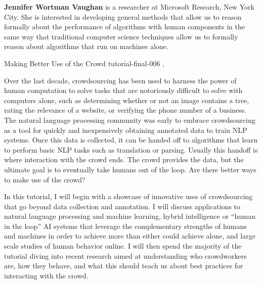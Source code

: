 \begin{bio}
  {\bfseries Jennifer Wortman Vaughan} is a researcher at Microsoft Research,
  New York City. She is interested in developing general methods that allow us
  to reason formally about the performance of algorithms with human components
  in the same way that traditional computer science techniques allow us to
  formally reason about algorithms that run on machines alone.

\end{bio}

\begin{tutorial}
  {Making Better Use of the Crowd}
  {tutorial-final-006}
  {\daydateyear, \tutorialafternoontime}
  {\TutLocF}

Over the last decade, crowdsourcing has been used to harness the power of human
computation to solve tasks that are notoriously difficult to solve with
computers alone, such as determining whether or not an image contains a tree,
rating the relevance of a website, or verifying the phone number of a business.
The natural language processing community was early to embrace crowdsourcing as
a tool for quickly and inexpensively obtaining annotated data to train NLP
systems. Once this data is collected, it can be handed off to algorithms that
learn to perform basic NLP tasks such as translation or parsing. Usually this
handoff is where interaction with the crowd ends. The crowd provides the data,
but the ultimate goal is to eventually take humans out of the loop. Are there
better ways to make use of the crowd?

In this tutorial, I will begin with a showcase of innovative uses of
crowdsourcing that go beyond data collection and annotation. I will discuss
applications to natural language processing and machine learning, hybrid
intelligence or “human in the loop” AI systems that leverage the complementary
strengths of humans and machines in order to achieve more than either could
achieve alone, and large scale studies of human behavior online. I will then
spend the majority of the tutorial diving into recent research aimed at
understanding who crowdworkers are, how they behave, and what this should
teach us about best practices for interacting with the crowd.

\end{tutorial}